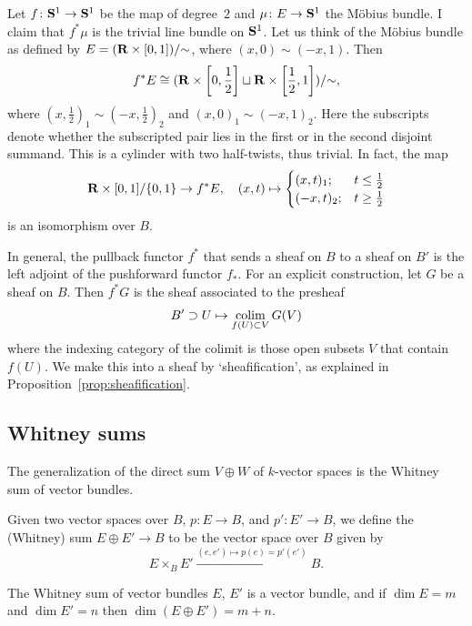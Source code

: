 \documentclass[a4paper,openany]{scrbook}
\begin{document}
\begin{example}
Let $f\colon \S^1 \to \S^1$ be the map of degree~$2$ and $\mu\colon E \to \S^1$ the Möbius bundle. I claim that $f^*\mu$ is the trivial line bundle on $\S^1$. Let us think of the Möbius bundle as defined by $E = (\R \times [0,1])/\mathord\sim$, where $(x,0) \sim (-x,1)$. Then
\[
f^*E \cong (\R \times \left[0,\frac12\right] \sqcup \R \times \left[\frac12,1\right])/\mathord\sim,
\]
where $(x,\frac12)_1 \sim (-x,\frac12)_2$ and $(x,0)_1 \sim (-x,1)_2$. Here the subscripts denote whether the subscripted pair lies in the first or in the second disjoint summand. This is a cylinder with two half-twists, thus trivial. In fact, the map
\[
\R \times [0,1]/\{0,1\} \to f^*E, \quad (x,t) \mapsto \begin{cases} (x,t)_1; & t \leq \frac12\\(-x,t)_2; & t \geq \frac12\end{cases}
\]
is an isomorphism over $B$.

\end{example}

In general, the pullback functor $f^*$ that sends a sheaf on $B$ to a sheaf on $B'$ is the left adjoint of the pushforward functor $f_*$. For an explicit construction, let $G$ be a sheaf on $B$. Then $f^*G$ is the sheaf associated to the presheaf
\begin{align*}
B' \supset U \mapsto \colim_{f(U) \subset V} G(V)
\end{align*}
where the indexing category of the colimit is those open subsets $V$ that contain $f(U)$. We make this into a sheaf by `sheafification', as explained in Proposition~\ref{prop:sheafification}.


\subsection{Whitney sums} \label{ssec:whitneysums}

The generalization of the direct sum $V \oplus W$ of $k$-vector spaces is the Whitney sum of vector bundles.

\begin{defn}
Given two vector spaces over $B$, $p\colon E \to B$, and $p'\colon E' \to B$, we define the (Whitney) sum $E \oplus E' \to B$ to be the vector space over $B$ given by 
\[
E \times_B E' \xrightarrow{(e,e') \mapsto p(e) = p'(e')} B.
\]
\end{defn}

\begin{lemma}
The Whitney sum of vector bundles $E$, $E'$ is a vector bundle, and if $\dim E = m$ and $\dim E' = n$ then $\dim(E\oplus E') = m+n$.
\end{lemma}
\end{document}
